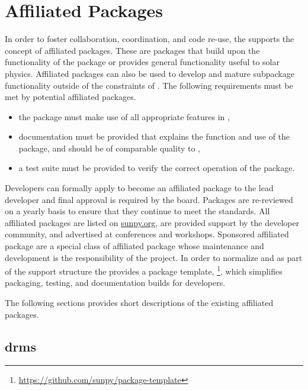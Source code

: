\section{Affiliated Packages}
\label{sec:affil_package}

In order to foster collaboration, coordination, and code re-use, the \sunpyproj supports the concept of affiliated packages.
These are \python packages that build upon the functionality of the \sunpypkg package or provides general functionality useful to solar physics.
Affiliated packages can also be used to develop and mature subpackage functionality outside of the constraints of \sunpypkg.
The following requirements must be met by potential affiliated packages.
\begin{itemize}
    \item the package must make use of all appropriate features in \sunpypkg, 
    \item documentation must be provided that explains the function and use of the package, and should be of comparable quality to \sunpypkg,
    \item a test suite must be provided to verify the correct operation of the package.
\end{itemize}
Developers can formally apply to become an affiliated package to the lead developer and final approval is required by the \sunpy board.
Packages are re-reviewed on a yearly basis to ensure that they continue to meet the standards.
All affiliated packages are listed on \url{sunpy.org}, are provided support by the \sunpy developer community, and advertised at conferences and workshops.
Sponsored affiliated package are a special class of affiliated package whose maintenance and development is the responsibility of the \sunpy project.
In order to normalize and as part of the support structure the \sunpyproj provides a package template, \footnote{\url{https://github.com/sunpy/package-template}}, which simplifies packaging, testing, and documentation builds for developers. 

The following sections provides short descriptions of the existing affiliated packages.

\subsection{drms}
\label{sec:drms}

